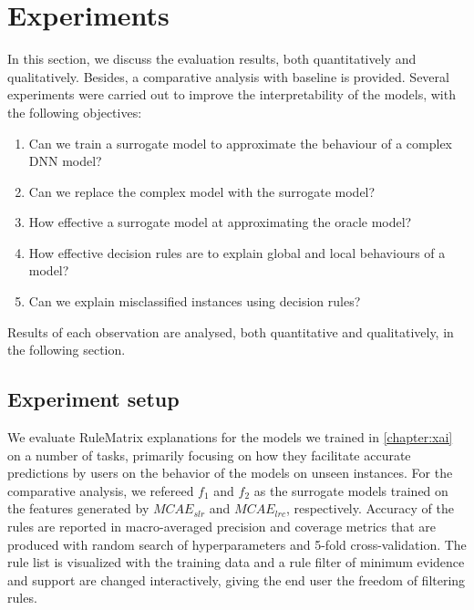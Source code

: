 \section{Experiments} \label{chapter_7:results}
In this section, we discuss the evaluation results, both quantitatively and qualitatively. Besides, a comparative analysis with baseline is provided. Several experiments were carried out to improve the interpretability of the models, with the following objectives:

\begin{enumerate}[noitemsep]
    \item Can we train a surrogate model to approximate the behaviour of a complex DNN model? 
    \item Can we replace the complex model with the surrogate model? 
    \item How effective a surrogate model at approximating the oracle model?  
    \item How effective decision rules are to explain global and local behaviours of a model?   
    \item Can we explain misclassified instances using decision rules? 
\end{enumerate}

\hspace*{3.5mm} Results of each observation are analysed, both quantitative and qualitatively, in the following section.

\subsection{Experiment setup}
We evaluate RuleMatrix explanations for the models we trained in \cref{chapter:xai} on a number of tasks, primarily focusing on how they facilitate accurate predictions by users on the behavior of the models on unseen instances. For the comparative analysis, we refereed $f_1$ and $f_2$ as the surrogate models trained on the features generated by $MCAE_{slr}$ and $MCAE_{lrc}$, respectively.  
Accuracy of the rules are reported in macro-averaged precision and coverage metrics that are produced with random search of hyperparameters and 5-fold cross-validation. The rule list is visualized with the training data and a rule filter of minimum evidence and support are changed interactively, giving the end user the freedom of filtering rules. 

